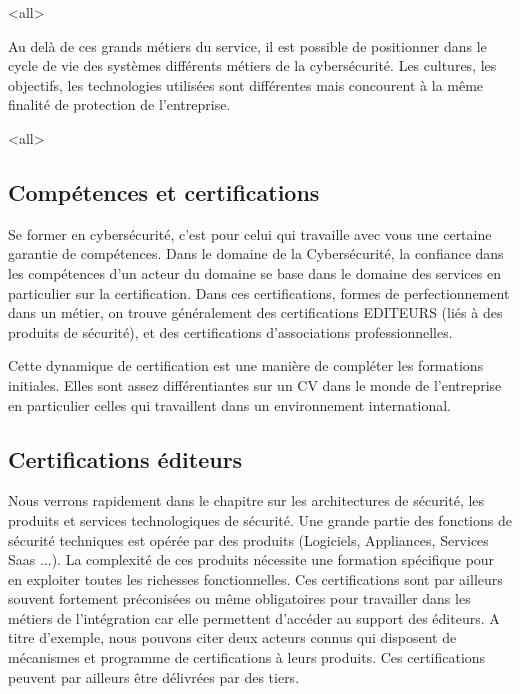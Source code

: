 \mode<all>{}

Au delà de ces grands métiers du service, il est possible de positionner dans le cycle de vie des systèmes différents métiers de la cybersécurité. Les cultures, les objectifs, les technologies utilisées sont différentes mais concourent à la même finalité de protection de l'entreprise.

\mode<all>{}


\subsection{Compétences et certifications}

Se former en cybersécurité, c'est pour celui qui travaille avec vous une certaine garantie de compétences. Dans le domaine de la Cybersécurité, la confiance dans les compétences d'un acteur du domaine se base dans le domaine des services en particulier sur la certification. Dans ces certifications, formes de perfectionnement dans un métier, on trouve généralement des  certifications EDITEURS (liés à des produits de sécurité), et des certifications d'associations professionnelles. 

Cette dynamique de certification est une manière de compléter les formations initiales. Elles sont  assez différentiantes sur un CV dans le monde de l'entreprise en particulier celles qui travaillent dans un environnement international.


\subsection{Certifications éditeurs}

Nous verrons rapidement dans le chapitre sur les architectures de sécurité, les produits et services technologiques de sécurité. Une grande partie des fonctions de sécurité techniques est opérée par des produits (Logiciels, Appliances, Services Saas ...). La complexité de ces produits nécessite une formation spécifique pour en exploiter toutes les richesses fonctionnelles.
Ces certifications sont par ailleurs souvent fortement préconisées ou même obligatoires pour travailler dans les métiers de l'intégration car elle permettent d'accéder au support des éditeurs. A titre d'exemple, nous pouvons citer deux acteurs connus qui disposent de mécanismes et programme de certifications à leurs produits. Ces certifications peuvent par ailleurs être délivrées par des tiers.

